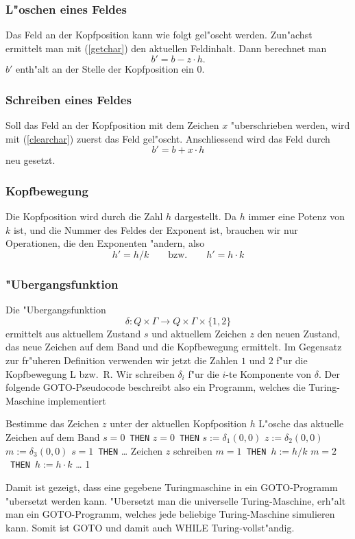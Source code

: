 \subsubsection{L"oschen eines Feldes}
Das Feld an der Kopfposition kann wie folgt gel"oscht werden.
Zun"achst ermittelt man mit (\ref{getchar}) den aktuellen Feldinhalt.
Dann berechnet man
\begin{equation}
b' = b - z\cdot h.
\label{clearchar}
\end{equation}
$b'$ enth"alt an der Stelle der Kopfposition ein $0$.

\subsubsection{Schreiben eines Feldes}
Soll das Feld an der Kopfposition mit dem Zeichen $x$ "uberschrieben
werden, wird mit (\ref{clearchar}) zuerst das Feld gel"oscht.
Anschliessend wird das Feld durch 
\[
b'=b+x\cdot h
\]
neu gesetzt.

\subsubsection{Kopfbewegung}
Die Kopfposition wird durch die Zahl $h$ dargestellt.
Da $h$ immer eine Potenz von $k$ ist, und die Nummer des Feldes der
Exponent ist, brauchen wir nur Operationen, die den Exponenten
"andern, also
\[
h'=h/k\qquad\text{bzw.}\qquad h'=h\cdot k
\]

\subsubsection{"Ubergangsfunktion}
Die "Ubergangsfunktion
\[
\delta\colon Q\times \Gamma\to Q\times \Gamma\times\{1, 2\}
\]
ermittelt aus aktuellem Zustand $s$ und
aktuellem Zeichen $z$ den neuen Zustand, das neue Zeichen auf
dem Band und die Kopfbewegung ermittelt. Im Gegensatz zur fr"uheren
Definition verwenden wir jetzt die Zahlen $1$ und $2$ f"ur die 
Kopfbewegung L bzw.~R.
Wir schreiben $\delta_i$ f"ur die $i$-te Komponente von $\delta$.
Der folgende GOTO-Pseudocode
beschreibt also ein Programm, welches die Turing-Maschine implementiert
\begin{algorithmic}[1]
\STATE Bestimme das Zeichen $z$ unter der aktuellen Kopfposition $h$
\STATE L"osche das aktuelle Zeichen auf dem Band
$s=0${\tt\ THEN}
$z=0${\tt\ THEN}
\STATE {\tt \ \ \ \ \ \ \ \ }$s:=\delta_1(0,0)$
\STATE {\tt \ \ \ \ \ \ \ \ }$z:=\delta_2(0,0)$
\STATE {\tt \ \ \ \ \ \ \ \ }$m:=\delta_3(0,0)$
$s=1${\tt\ THEN}
\STATE {\tt \ \ \ \ }\dots
{}
\STATE Zeichen $z$ schreiben
$m=1${\tt\ THEN }$h:=h/k$
$m=2${\tt\ THEN }$h:=h\cdot k$
\STATE \dots
{}1
\end{algorithmic}
Damit ist gezeigt, dass eine gegebene Turingmaschine in ein
GOTO-Programm "ubersetzt werden kann. "Ubersetzt man die universelle
Turing-Maschine, erh"alt man ein GOTO-Programm, welches jede beliebige 
Turing-Maschine simulieren kann. Somit ist GOTO und damit auch WHILE
Turing-vollst"andig.

